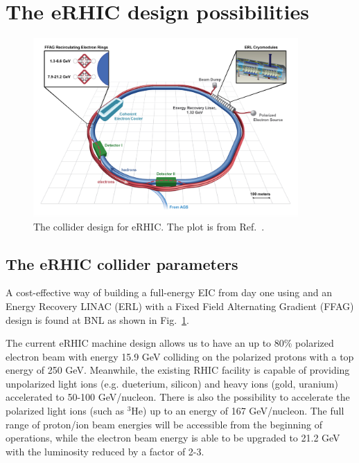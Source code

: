 \section{The eRHIC design possibilities}
\begin{figure}
\centering
\includegraphics[width=0.9\textwidth]{plots/chpt4/collider_eRHIC.png}
\caption[A layout of the eRHIC collider design]{
The collider design for eRHIC. The plot is from Ref.~\cite{Aschenauer:2014a}.}
\label{fig:collider_eRHIC}
\end{figure}
\subsection{The eRHIC collider parameters}
A cost-effective way of building a full-energy EIC from day one using and an
Energy Recovery LINAC (ERL) with a Fixed Field Alternating Gradient (FFAG)
design is found at BNL as shown in Fig.~\ref{fig:collider_eRHIC}.

The current eRHIC machine design allows us to have an up to 80\% polarized electron
beam with energy 15.9 GeV colliding on the polarized protons with a top energy
of 250 GeV. Meanwhile, the existing RHIC facility is capable of providing
unpolarized light ions (e.g. dueterium, silicon) and heavy ions (gold, uranium)
accelerated to 50-100 GeV/nucleon. There is also the possibility to accelerate
the polarized light ions (such as $^{3}$He) up to an energy of 167 GeV/nucleon.
The full range of proton/ion beam energies will be accessible from the beginning
of operations, while the electron beam energy is able to be upgraded to 21.2 GeV
with the luminosity reduced by a factor of 2-3.

